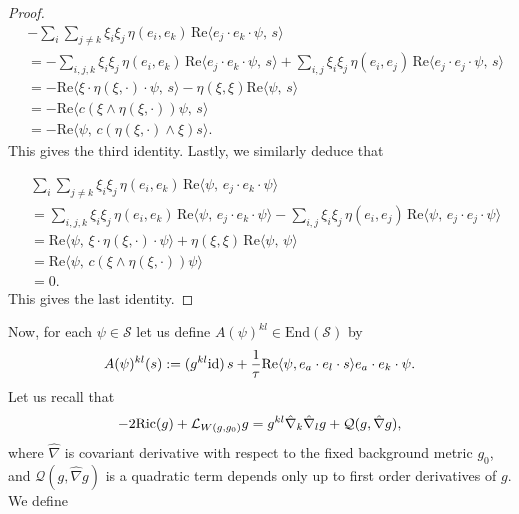\documentclass{amsart}
\theoremstyle{definition}
\theoremstyle{remark}
\numberwithin{equation}{section}
\newcommand{\Ric}{\textup{Ric}}
\begin{document}
\begin{proof}
	\begin{align*}
		&-\sum_i\sum_{j\neq k}\xi_i\xi_j\, \eta(e_i,e_k)\, \text{Re}\langle e_j\cdot e_k\cdot\psi,\, s\rangle \\[1ex]
		&= -\sum_{i,j,k}\xi_i\xi_j\, \eta(e_i,e_k)\, \text{Re}\langle e_j\cdot e_k\cdot\psi,\, s\rangle + \sum_{i,j}\xi_i\xi_j\, \eta(e_i,e_j)\, \text{Re}\langle e_j\cdot e_j\cdot\psi,\, s\rangle\\[1ex]
		&= -\text{Re}\langle\xi\cdot\eta(\xi,\cdot)\cdot\psi,\, s\rangle -\eta(\xi,\xi) \text{Re}\langle\psi,\, s\rangle \\[1ex]
		&= -\text{Re}\langle c(\xi\wedge \eta(\xi,\cdot))\psi,\, s\rangle\\[1ex]
		&= -\text{Re}\langle \psi,\, c( \eta(\xi,\cdot)\wedge\xi) s\rangle.
	\end{align*}	
	This gives the third identity. Lastly, we similarly deduce that
	
	\begin{align*}
		&\sum_i\sum_{j\neq k}\xi_i\xi_j\, \eta(e_i,e_k)\, \text{Re}\langle\psi,\,e_j\cdot e_k\cdot\psi\rangle\\[1ex]
		&= \sum_{i,j,k}\xi_i\xi_j\, \eta(e_i,e_k)\, \text{Re}\langle\psi,\,e_j\cdot e_k\cdot\psi\rangle - \sum_{i,j}\xi_i\xi_j\, \eta(e_i,e_j)\, \text{Re}\langle\psi,\,e_j\cdot e_j\cdot\psi\rangle\\[1ex]
		&= \text{Re}\langle \psi,\, \xi\cdot \eta(\xi,\cdot)\cdot \psi\rangle + \eta(\xi,\xi)\,\text{Re}\langle\psi,\,\psi\rangle\\[1ex]
		&= \text{Re}\langle \psi,\, c(\xi\wedge \eta(\xi,\cdot)) \psi\rangle\\[1ex]
		&=0.
	\end{align*}
	This gives the last identity. 
\end{proof}
\vspace{0.5cm}
Now, for each $\psi\in\mathcal{S}$ let us define  $A(\psi)^{kl}\in\text{End}(\mathcal{S})$  by
	\begin{align}
		A(\psi)^{kl}(s) := (g^{kl}\text{id})\, s + \frac{1}{\tau}\textup{Re}\langle\psi, e_a\cdot e_l\cdot s\rangle e_a\cdot e_k\cdot \psi.
	\end{align}
 Let us recall that 
	\begin{align*}
		- 2\Ric(g) + \mathcal{L}_{W(g,g_0)}g = g^{kl}\hat{\nabla}_k\hat{\nabla}_l g + \mathcal{Q}(g, \hat{\nabla} g),
	\end{align*}
	where $\hat{\nabla}$ is covariant derivative with respect to the fixed background metric $g_0$, and $\mathcal{Q}(g, \hat{\nabla} g)$ is a quadratic term depends only up to first order derivatives of $g$. We define
\end{document}
